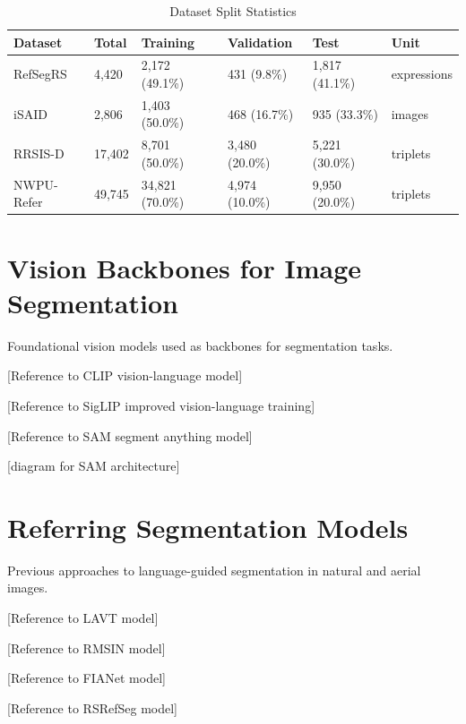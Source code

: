 \begin{table}[htbp]
\centering
\caption{Dataset Split Statistics}
\label{tab:dataset_splits}
\begin{tabular}{@{}llllll@{}}
\toprule
\textbf{Dataset} & \textbf{Total} & \textbf{Training} & \textbf{Validation} & \textbf{Test} & \textbf{Unit} \\
\midrule
RefSegRS & 4,420 & 2,172 (49.1\%) & 431 (9.8\%) & 1,817 (41.1\%) & expressions \\
iSAID & 2,806 & 1,403 (50.0\%) & 468 (16.7\%) & 935 (33.3\%) & images \\
RRSIS-D & 17,402 & 8,701 (50.0\%) & 3,480 (20.0\%) & 5,221 (30.0\%) & triplets \\
NWPU-Refer & 49,745 & 34,821 (70.0\%) & 4,974 (10.0\%) & 9,950 (20.0\%) & triplets \\
\bottomrule
\end{tabular}
\end{table}

\section{Vision Backbones for Image Segmentation}

Foundational vision models used as backbones for segmentation tasks.

[Reference to CLIP vision-language model] %

[Reference to SigLIP improved vision-language training] %

[Reference to SAM segment anything model] %

[diagram for SAM architecture]

\section{Referring Segmentation Models}

Previous approaches to language-guided segmentation in natural and aerial images.

[Reference to LAVT model] %

[Reference to RMSIN model] %

[Reference to FIANet model] %

[Reference to RSRefSeg model] %

